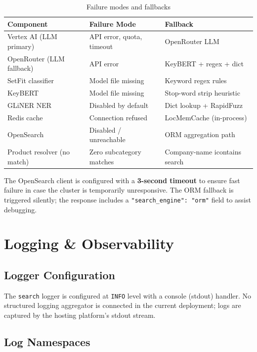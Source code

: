\documentclass[12pt,a4paper]{article}
\begin{document}
\begin{table}[H]
\centering
\renewcommand{\arraystretch}{1.4}
\begin{tabularx}{\textwidth}{lXX}
\toprule
\rowcolor{tableheader!20}
\textbf{Component} & \textbf{Failure Mode} & \textbf{Fallback} \\
\midrule
Vertex AI (LLM primary) &
  API error, quota, timeout &
  OpenRouter LLM \\
OpenRouter (LLM fallback) &
  API error &
  KeyBERT + regex + dict \\
SetFit classifier &
  Model file missing &
  Keyword regex rules \\
KeyBERT &
  Model file missing &
  Stop-word strip heuristic \\
GLiNER NER &
  Disabled by default &
  Dict lookup + RapidFuzz \\
Redis cache &
  Connection refused &
  LocMemCache (in-process) \\
OpenSearch &
  Disabled / unreachable &
  ORM aggregation path \\
Product resolver (no match) &
  Zero subcategory matches &
  Company-name icontains search \\
\bottomrule
\end{tabularx}
\caption{Failure modes and fallbacks}
\end{table}

The OpenSearch client is configured with a \textbf{3-second timeout} to ensure fast
failure in case the cluster is temporarily unresponsive.  The ORM fallback is triggered
silently; the response includes a \texttt{"search\_engine": "orm"} field to assist
debugging.

\newpage
\section{Logging \& Observability}
\label{sec:logging}

\subsection{Logger Configuration}

The \texttt{search} logger is configured at \texttt{INFO} level with a console
(stdout) handler.  No structured logging aggregator is connected in the current
deployment; logs are captured by the hosting platform's stdout stream.

\subsection{Log Namespaces}
\end{document}
